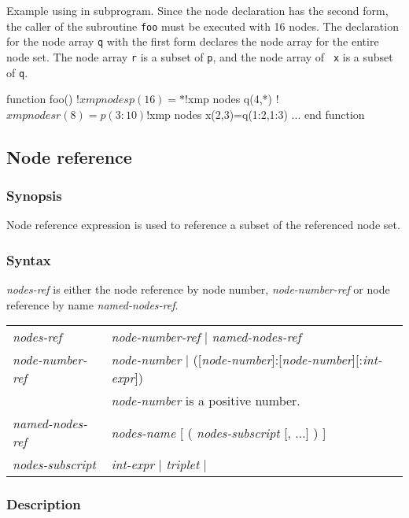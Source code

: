 Example using in subprogram. Since the node
declaration has the second form, the caller of the subroutine {\tt foo} must
be executed with 16 nodes. The declaration for the node array {\tt q} with
the first form declares the node array for the entire node set. The
node array {\tt r} is a subset of {\tt p}, and the node array of {\tt
  x} is a subset of {\tt q}.

\begin{Fexample}
      function foo()
!$xmp nodes p(16)=*
!$xmp nodes q(4,*)
!$xmp nodes r(8)=p(3:10)
!$xmp nodes x(2,3)=q(1:2,1:3)
      ...
      end function
\end{Fexample}

\subsection{Node reference}

\subsubsection*{Synopsis}

Node reference expression is
used to reference a subset of the referenced node set.

\subsubsection*{Syntax}

{\it nodes-ref} is either the node reference by node number,
{\it node-number-ref} or node reference by name {\it named-nodes-ref}.

\begin{center}
\begin{tabular}{ll}
{\it nodes-ref} & {\it node-number-ref} | {\it named-nodes-ref} \\
{\it node-number-ref} & {\it node-number} | ([{\it node-number}]:[{\it node-number}][:{\it int-expr}]) \\
& {\it node-number} is a positive number. \\
{\it named-nodes-ref} & {\it nodes-name} [ ( {\it nodes-subscript}
[,  ...] ) ] \\
{\it nodes-subscript} & {\it int-expr} | {\it triplet} | {\tt *} \\
\end{tabular}
\end{center}

\subsubsection*{Description}

